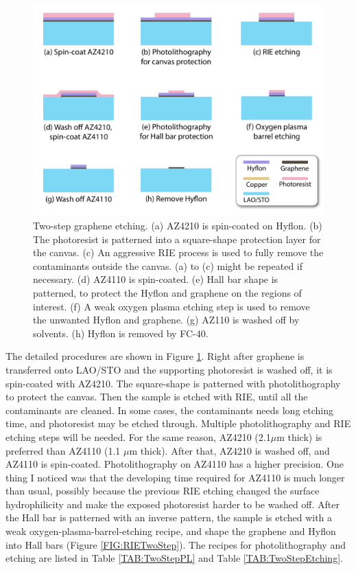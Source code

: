 \documentclass[pdflatex, sectionletters, 12pt]{pittetd}    %
\begin{document}
\begin{figure}[p]
	\centering
	\includegraphics[width=.8\textwidth]{Drawing/TwoStepEtching.pdf}
	\caption{Two-step graphene etching. (a) AZ4210 is spin-coated on Hyflon. (b) The photoresist is patterned into a square-shape protection layer for the canvas. (c) An aggressive RIE process is used to fully remove the contaminants outside the canvas. (a) to (c) might be repeated if necessary. (d) AZ4110 is spin-coated. (e) Hall bar shape is patterned, to protect the Hyflon and graphene on the regions of interest. (f) A weak oxygen plasma etching step is used to remove the unwanted Hyflon and graphene. (g) AZ110 is washed off by solvents. (h) Hyflon is removed by FC-40.}
	\label{FIG:TwoStepEtching}
\end{figure}

The detailed procedures are shown in Figure \ref{FIG:TwoStepEtching}. Right after graphene is transferred onto LAO/STO and the supporting photoresist is washed off, it is spin-coated with AZ4210. The square-shape is patterned with photolithography to protect the canvas. Then the sample is etched with RIE, until all the contaminants are cleaned. In some cases, the contaminants needs long etching time, and photoresist may be etched through. Multiple photolithography and RIE etching steps will be needed.
For the same reason, AZ4210 (2.1$\mu$m thick) is preferred than AZ4110 (1.1 $\mu$m thick). After that, AZ4210 is washed off, and AZ4110 is spin-coated. Photolithography on AZ4110 has a higher precision. One thing I noticed was that the developing time required for AZ4110 is much longer than usual, possibly because the previous RIE etching changed the surface hydrophilicity and make the exposed photoresist harder to be washed off. After the Hall bar is patterned with an inverse pattern, the sample is etched with a weak oxygen-plasma-barrel-etching recipe, and shape the graphene and Hyflon into Hall bars (Figure \ref{FIG:RIETwoStep}). The recipes for photolithography and etching are listed in Table \ref{TAB:TwoStepPL} and Table \ref{TAB:TwoStepEtching}.
\end{document}
